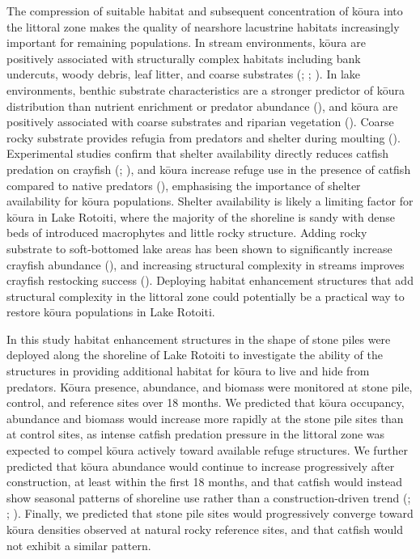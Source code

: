 \documentclass[
  letterpaper,
  DIV=11,
  numbers=noendperiod]{scrartcl}
\begin{document}
The compression of suitable habitat and subsequent concentration of
kōura into the littoral zone makes the quality of nearshore lacustrine
habitats increasingly important for remaining populations. In stream
environments, kōura are positively associated with structurally complex
habitats including bank undercuts, woody debris, leaf litter, and coarse
substrates (;
;
). In lake environments,
benthic substrate characteristics are a stronger predictor of kōura
distribution than nutrient enrichment or predator abundance
(), and kōura are
positively associated with coarse substrates and riparian vegetation
(). Coarse rocky
substrate provides refugia from predators and shelter during moulting
(). Experimental
studies confirm that shelter availability directly reduces catfish
predation on crayfish (;
), and kōura increase refuge
use in the presence of catfish compared to native predators
(), emphasising
the importance of shelter availability for kōura populations. Shelter
availability is likely a limiting factor for kōura in Lake Rotoiti,
where the majority of the shoreline is sandy with dense beds of
introduced macrophytes and little rocky structure. Adding rocky
substrate to soft-bottomed lake areas has been shown to significantly
increase crayfish abundance (), and increasing structural complexity in streams improves
crayfish restocking success (). Deploying habitat enhancement structures that add structural
complexity in the littoral zone could potentially be a practical way to
restore kōura populations in Lake Rotoiti.

In this study habitat enhancement structures in the shape of stone piles
were deployed along the shoreline of Lake Rotoiti to investigate the
ability of the structures in providing additional habitat for kōura to
live and hide from predators. Kōura presence, abundance, and biomass
were monitored at stone pile, control, and reference sites over 18
months. We predicted that kōura occupancy, abundance and biomass would
increase more rapidly at the stone pile sites than at control sites, as
intense catfish predation pressure in the littoral zone was expected to
compel kōura actively toward available refuge structures. We further
predicted that kōura abundance would continue to increase progressively
after construction, at least within the first 18 months, and that
catfish would instead show seasonal patterns of shoreline use rather
than a construction-driven trend (; ;
). Finally, we
predicted that stone pile sites would progressively converge toward
kōura densities observed at natural rocky reference sites, and that
catfish would not exhibit a similar pattern.
\end{document}
